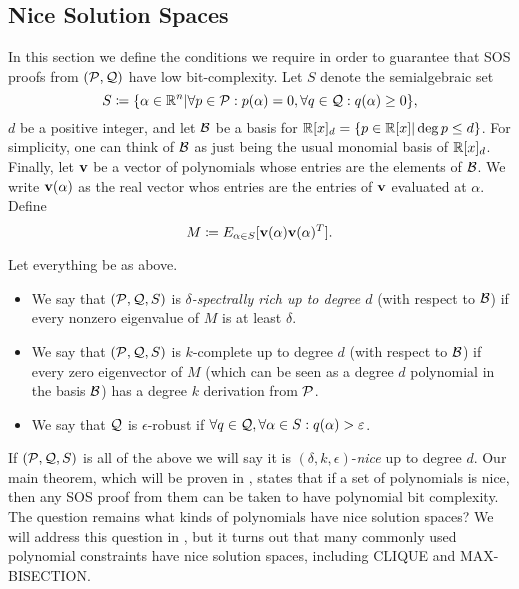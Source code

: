 \subsection{Nice Solution Spaces}
In this section we define the conditions we require in order to guarantee that SOS proofs from $(\mathcal P, \mathcal Q)$ have low bit-complexity. Let $S$ denote the semialgebraic set
\[S \coloneqq \{\alpha \in \mathbb R^n | \forall p \in \mathcal P: p(\alpha) = 0, \forall q \in \mathcal Q: q(\alpha) \geq 0\},\]
$d$ be a positive integer, and let $\mathcal B$ be a basis for $\mathbb R[x]_d = \{p \in \mathbb R[x] | \deg p \leq d\}$. For simplicity, one can think of $\mathcal B$ as just being the usual monomial basis of $\mathbb R[x]_d$. Finally, let ${\bf v}$ be a vector of polynomials whose entries are the elements of $\mathcal B$. We write ${\bf v}(\alpha)$ as the real vector whos entries are the entries of ${\bf v}$ evaluated at $\alpha$. Define
\[M \coloneqq E_{\alpha \in S}[{\bf v}(\alpha){\bf v}(\alpha)^T].\]
\begin{definition}
Let everything be as above.
\begin{itemize}
\item We say that $(\mathcal P, \mathcal Q, S)$ is \emph{$\delta$-spectrally rich up to degree $d$} (with respect to $\mathcal B$) if every nonzero eigenvalue of $M$ is at least $\delta$.
\item We say that $(\mathcal P, \mathcal Q, S)$ is $k$-complete up to degree $d$ (with respect to $\mathcal B$) if every zero eigenvector of $M$ (which can be seen as a degree $d$ polynomial in the basis $\mathcal B$) has a degree $k$ derivation from $\mathcal P$. 
\item We say that $\mathcal Q$ is $\epsilon$-robust if $\forall q \in \mathcal Q, \forall \alpha \in S: q(\alpha) > \varepsilon$.
\end{itemize}
\end{definition}
If $(\mathcal P, \mathcal Q, S)$ is all of the above we will say it is $(\delta, k, \epsilon)$-\emph{nice} up to degree $d$. Our main theorem, which will be proven in , states that if a set of polynomials is nice, then any SOS proof from them can be taken to have polynomial bit complexity. The question remains what kinds of polynomials have nice solution spaces? We will address this question in , but it turns out that many commonly used polynomial constraints have nice solution spaces, including CLIQUE and MAX-BISECTION.

